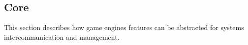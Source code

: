 \subsection{Core}
This section describes how game engines features can be abstracted for systems intercommunication and management.




